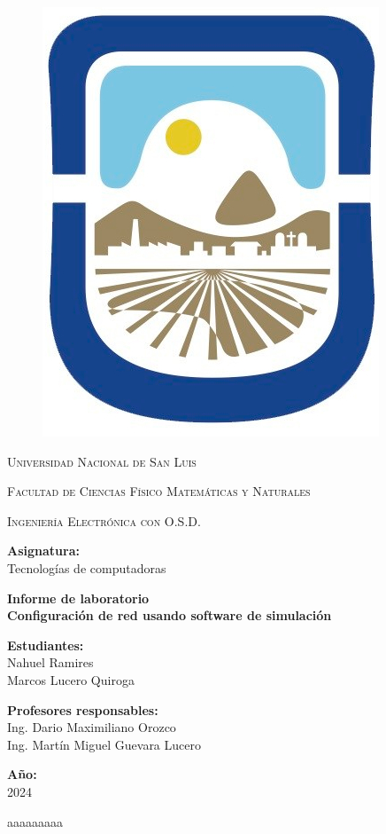 \documentclass{article}
\begin{document}
\begin{titlepage}	  
\centering

\begin{figure}
\centering
\includegraphics[width=0.15\linewidth]{logo-unsl.jpg}
\end{figure}     

{\scshape\LARGE Universidad Nacional de San Luis\par}
{\scshape Facultad de Ciencias Físico Matemáticas y Naturales\par}
{\scshape Ingeniería Electrónica con O.S.D.\par}
\bigskip 
\bigskip 
\bigskip 

\Large \textbf {Asignatura:\\} 
\LARGE Tecnologías de computadoras
\bigskip 
\bigskip 
\bigskip
\bigskip

\LARGE \textbf {Informe de laboratorio\\}
\bigskip
\LARGE \textbf {Configuración de red usando software de
simulación}
 
\bigskip
\bigskip
\bigskip

\LARGE \textbf {Estudiantes:\\} 
	\LARGE Nahuel Ramires\\ Marcos Lucero Quiroga

\bigskip


\bigskip
\bigskip
\bigskip
\bigskip
\bigskip
\bigskip

\Large \textbf {Profesores responsables:\\} 
\Large  Ing. Dario Maximiliano Orozco \\ Ing. Martín Miguel Guevara Lucero 
\bigskip
\bigskip
\bigskip
\bigskip
\bigskip
\bigskip
\bigskip
\bigskip
\bigskip

\Large \textbf {Año:\\} 
\Large 2024	
\end{titlepage}
\newpage



aaaaaaaaa
\end{document}
